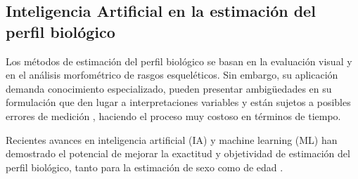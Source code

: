

\subsection{Inteligencia Artificial en la estimación del perfil biológico}

Los métodos de estimación del perfil biológico se basan en la evaluación visual y en el análisis morfométrico de rasgos
esqueléticos. Sin embargo, su aplicación demanda conocimiento especializado, pueden presentar ambigüedades en su 
formulación que den lugar a interpretaciones variables y están sujetos a posibles errores de medición \cite{langley2018},
haciendo el proceso muy costoso en términos de tiempo.

Recientes avances en inteligencia artificial (IA) y machine learning (ML) han demostrado el potencial de mejorar la 
exactitud y objetividad de estimación del perfil biológico, tanto para la estimación de sexo 
\cite{curate2017, darmawan2015, pinto2016} como de edad \cite{kim2017, larson2018, lee2017}. 


